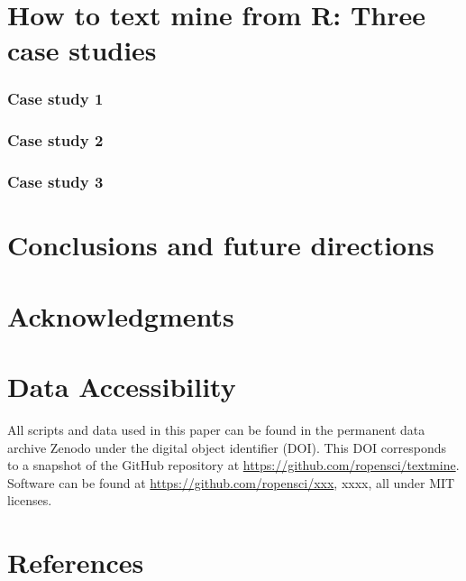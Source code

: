 \documentclass[author-year, review, 11pt]{components/elsarticle} %
\begin{document}
\section{How to text mine from R: Three case
studies}\label{how-to-text-mine-from-r-three-case-studies}

\subsubsection{Case study 1}\label{case-study-1}

\subsubsection{Case study 2}\label{case-study-2}

\subsubsection{Case study 3}\label{case-study-3}

\section{Conclusions and future
directions}\label{conclusions-and-future-directions}

\section{Acknowledgments}\label{acknowledgments}

\section{Data Accessibility}\label{data-accessibility}

All scripts and data used in this paper can be found in the permanent
data archive Zenodo under the digital object identifier (DOI). This DOI
corresponds to a snapshot of the GitHub repository at
\url{https://github.com/ropensci/textmine}. Software can be found at
\url{https://github.com/ropensci/xxx}, xxxx, all under MIT licenses.

\section{References}\label{references}
\end{document}
